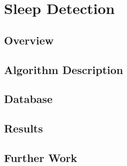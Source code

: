 \part{Sleep Detection}

    \chapter{Overview}

    \chapter{Algorithm Description}

    \chapter{Database}

    \chapter{Results}

    \chapter{Further Work}